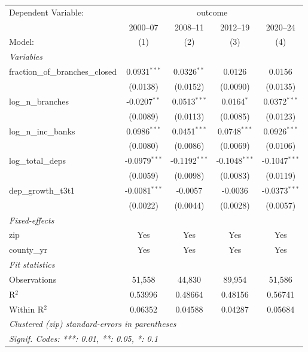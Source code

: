 \begingroup
\centering
\begin{tabular}{lcccc}
   \tabularnewline \midrule \midrule
   Dependent Variable: & \multicolumn{4}{c}{outcome}\\
                                     & 2000–07         & 2008–11         & 2012–19         & 2020–24 \\   
   Model:                            & (1)             & (2)             & (3)             & (4)\\  
   \midrule
   \emph{Variables}\\
   fraction\_of\_branches\_closed    & 0.0931$^{***}$  & 0.0326$^{**}$   & 0.0126          & 0.0156\\   
                                     & (0.0138)        & (0.0152)        & (0.0090)        & (0.0135)\\   
   log\_n\_branches                  & -0.0207$^{**}$  & 0.0513$^{***}$  & 0.0164$^{*}$    & 0.0372$^{***}$\\   
                                     & (0.0089)        & (0.0113)        & (0.0085)        & (0.0123)\\   
   log\_n\_inc\_banks                & 0.0986$^{***}$  & 0.0451$^{***}$  & 0.0748$^{***}$  & 0.0926$^{***}$\\   
                                     & (0.0080)        & (0.0086)        & (0.0069)        & (0.0106)\\   
   log\_total\_deps                  & -0.0979$^{***}$ & -0.1192$^{***}$ & -0.1048$^{***}$ & -0.1047$^{***}$\\   
                                     & (0.0059)        & (0.0098)        & (0.0083)        & (0.0119)\\   
   dep\_growth\_t3t1                 & -0.0081$^{***}$ & -0.0057         & -0.0036         & -0.0373$^{***}$\\   
                                     & (0.0022)        & (0.0044)        & (0.0028)        & (0.0057)\\   
   \midrule
   \emph{Fixed-effects}\\
   zip                               & Yes             & Yes             & Yes             & Yes\\  
   county\_yr                        & Yes             & Yes             & Yes             & Yes\\  
   \midrule
   \emph{Fit statistics}\\
   Observations                      & 51,558          & 44,830          & 89,954          & 51,586\\  
   R$^2$                             & 0.53996         & 0.48664         & 0.48156         & 0.56741\\  
   Within R$^2$                      & 0.06352         & 0.04588         & 0.04287         & 0.05684\\  
   \midrule \midrule
   \multicolumn{5}{l}{\emph{Clustered (zip) standard-errors in parentheses}}\\
   \multicolumn{5}{l}{\emph{Signif. Codes: ***: 0.01, **: 0.05, *: 0.1}}\\
\end{tabular}
\par\endgroup
